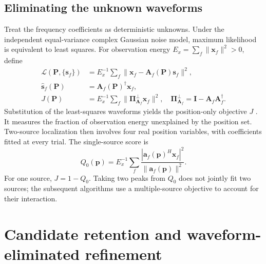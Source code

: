\documentclass[a4paper,fleqn,review]{cas-sc}
\begin{document}
\subsection{Eliminating the unknown waveforms}
Treat the frequency coefficients as deterministic unknowns. Under the independent equal-variance complex Gaussian noise model, maximum likelihood is equivalent to least squares. For observation energy $E_x=\sum_f\|\bm x_f\|^2>0$, define
\begin{align}
\mathcal L(\bm P,\{\bm s_f\})&=E_x^{-1}\sum_f
 \|\bm x_f-\bm A_f(\bm P)\bm s_f\|^2,\\
\widehat{\bm s}_f(\bm P)&=\bm A_f(\bm P)^\dagger\bm x_f,\label{en:waveLS}\\
J(\bm P)&=E_x^{-1}\sum_f\|\bm\Pi_{\bm A_f}^{\perp}\bm x_f\|^2,
\quad \bm\Pi_{\bm A_f}^{\perp}=\bm I-\bm A_f\bm A_f^\dagger.
\label{en:profile}
\end{align}
Substitution of the least-squares waveforms yields the position-only objective $J$ \cite{GolubPereyra1973}. It measures the fraction of observation energy unexplained by the position set. Two-source localization then involves four real position variables, with coefficients fitted at every trial. The single-source score is
\begin{equation}
Q_0(\bm p)=E_x^{-1}\sum_f
 \frac{|\bm a_f(\bm p)^H\bm x_f|^2}{\|\bm a_f(\bm p)\|^2}.
\label{en:single}
\end{equation}
For one source, $J=1-Q_0$. Taking two peaks from $Q_0$ does not jointly fit two sources; the subsequent algorithms use a multiple-source objective to account for their interaction.

\FloatBarrier
\section{Candidate retention and waveform-eliminated refinement}
\FloatBarrier
\end{document}
